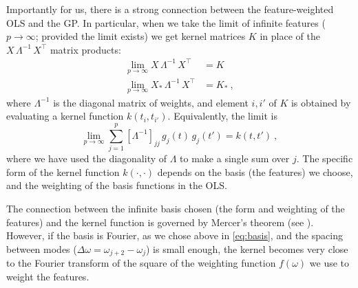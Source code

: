 \documentclass[12pt,letterpaper]{article}
\begin{document}
Importantly for us, there is a strong connection between the feature-weighted OLS and the GP.
In particular, when we take the limit of infinite features ($p\rightarrow\infty$; provided the limit exists) we get kernel matrices $K$ in place of the $X\,\Lambda^{-1}\,X^\top$ matrix products:
\begin{align}
    \lim_{p\rightarrow\infty} X\,\Lambda^{-1}\,X^\top &= K
    \\
    \lim_{p\rightarrow\infty} X_\ast\,\Lambda^{-1}\,X^\top &= K_\ast
    ~,
    \label{eq.limit}
\end{align}
where $\Lambda^{-1}$ is the diagonal matrix of weights, and element $i,i'$ of $K$ is obtained by evaluating a kernel function $k(t_i,t_{i'})$.
Equivalently, the limit is
\begin{equation}
    \lim_{p\rightarrow\infty} \sum_{j=1}^p [\Lambda^{-1}]_{jj}\,g_j(t)\,g_{j}(t') = k(t, t')
    ~,
\end{equation}
where we have used the diagonality of $\Lambda$ to make a single sum over $j$.
The specific form of the kernel function $k(\cdot,\cdot)$ depends on the basis (the features) we choose, and the weighting of the basis functions in the OLS.

The connection between the infinite basis chosen (the form and weighting of the features) and the kernel function is governed by Mercer's theorem (see \citealt{minh2006mercer}).
However, if the basis is Fourier, as we chose above in \eqref{eq:basis}, and the spacing between modes ($\Delta\omega =\omega_{j+2}-\omega_j$) is small enough, the kernel becomes very close to the Fourier transform of the square of the weighting function $f(\omega)$ we use to weight the features.
\end{document}
